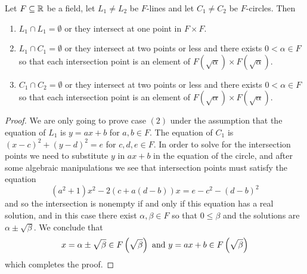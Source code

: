 \documentclass[11pt,a4paper]{article}
\begin{document}
\begin{lemma}
  \label{lem:previous}
  Let $F \subseteq \mathbb{R}$ be a field,
  let $L_1 \neq L_2$ be $F$-lines
  and let $C_1 \neq C_2$ be $F$-circles.
  Then
  \begin{enumerate}
    \item[(1)] $L_1 \cap L_1 = \emptyset$ or they intersect at one point
      in $F \times F$.
    \item[(2)] $L_1 \cap C_1 = \emptyset$ or they intersect at two points
      or less and there exists $0 < \alpha \in F$ so that each intersection
      point is an element of $F(\sqrt \alpha) \times F(\sqrt \alpha)$.
    \item[(3)] $C_1 \cap C_2 = \emptyset$ or they intersect at two points
      or less and there exists $0 < \alpha \in F$ so that each intersection
      point is an element of $F(\sqrt \alpha) \times F(\sqrt \alpha)$.
  \end{enumerate}
\end{lemma}
\begin{proof}
  We are only going to prove case $(2)$ under the assumption that
  the equation of $L_1$ is $y = ax + b$ for $a,b \in F$.
  The equation of $C_1$ is $(x - c)^2 + (y - d)^2 = e$ for $c,d,e \in F$.
  In order to solve for the intersection points we need to substitute
  $y$ in $ax + b$ in the equation of the circle, and after some
  algebraic manipulations we see that intersection points must satisfy
  the equation
  \[
    (a^2 + 1) x^2 - 2(c + a(d - b))x =
    e - c^2 - (d - b)^2
  \]
  and so the intersection is nonempty if and only if this equation has
  a real solution, and in this case there exist $\alpha,\beta \in F$
  so that $0 \le \beta$ and the solutions are $\alpha \pm \sqrt{\beta}$.
  We conclude that
  \[
    x = \alpha \pm \sqrt{\beta} \in F\left(\sqrt \beta\right) \text{ and }
    y = ax + b \in F\left(\sqrt \beta\right)
  \]
  which completes the proof.
\end{proof}
\end{document}
